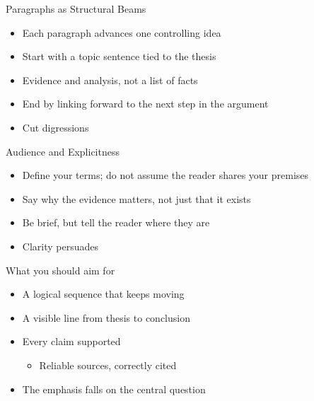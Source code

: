 \documentclass[aspectratio=169]{beamer}
\begin{document}
\begin{frame}{Paragraphs as Structural Beams}
\begin{itemize}
  \item Each paragraph advances one controlling idea
  \item Start with a topic sentence tied to the thesis
  \item Evidence and analysis, not a list of facts
  \item End by linking forward to the next step in the argument
  \item Cut digressions
\end{itemize}
\end{frame}


\begin{frame}{Audience and Explicitness}
\begin{itemize}
  \item Define your terms; do not assume the reader shares your premises
  \item Say why the evidence matters, not just that it exists
  \item Be brief, but tell the reader where they are
  \item Clarity persuades
\end{itemize}
\end{frame}


\begin{frame}{What you should aim for}
\begin{itemize}
  \item A logical sequence that keeps moving
  \item A visible line from thesis to conclusion
  \item Every claim supported
    \begin{itemize}
    \item Reliable sources, correctly cited
    \end{itemize}
  \item The emphasis falls on the central question
\end{itemize}
\end{frame}
\end{document}

